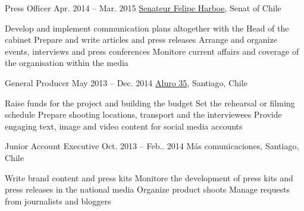 \begin{joblist}[13.2][7.8][3.4]
\item[Press Officer]{Apr. 2014 -- Mar. 2015}
     {
     \href{https://www.harboe.cl/}{Senateur Felipe Harboe}, Senat of Chile
     } 
	 {
            \vspace{-0.5cm}
			\iftbftiny \setlength{\parskip}{-10pt} \fi
			\begin{itemize}
			  \iftbftiny \setlength\itemsep{-3pt} \fi
			  \cvitem[\checkmark] Develop and implement communication plans altogether with the Head of the cabinet
			  \cvitem[\checkmark] Prepare and write articles and press releases
			  \cvitem[\checkmark] Arrange and organize events, interviews and press conferences
			  \cvitem[\checkmark] Monitore current affairs and coverage of the organisation within the media
			\end{itemize}     
	}
    
        
\item[General Producer]{May 2013 -- Dec. 2014}
     {
     \href{https://www.aluro35.com/}{Aluro 35}, Santiago, Chile
     }
     {	
             \vspace{-0.5cm}
			\iftbftiny \setlength{\parskip}{-10pt} \fi
			\begin{itemize}
			  \iftbftiny \setlength\itemsep{-3pt} \fi
			  \cvitem[\checkmark] Raise funds for the project and building the budget
			  \cvitem[\checkmark] Set the rehearsal or filming schedule
			  \cvitem[\checkmark] Prepare shooting locations, transport and the interviewees 
			  \cvitem[\checkmark] Provide engaging text, image and video content for social media accounts
			\end{itemize}     
	}



\item[Junior Account Executive ]{Oct. 2013 -- Feb.. 2014 }     
  	{
  	Más comunicaciones, Santiago, Chile
  	}     
  	{
        \vspace{-0.5cm}
		\iftbftiny \setlength{\parskip}{-10pt} \fi
		\begin{itemize}
			  \iftbftiny \setlength\itemsep{-3pt} \fi
			  \cvitem[\checkmark] Write brand content and press kits
			  \cvitem[\checkmark] Monitore the development of press kits and press releases in the national media
			  \cvitem[\checkmark] Organize product shoots
			  \cvitem[\checkmark] Manage requests from journalists and bloggers
		\end{itemize}       
	}





\end{joblist}
